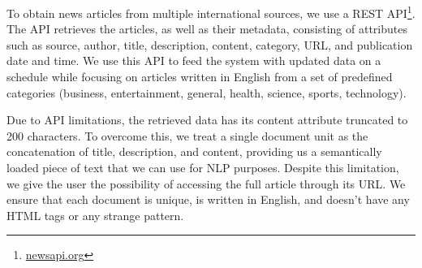 \documentclass[a4paper]{article}
\begin{document}
\begin{table}[H]
  \centering
  \caption{Competitive Intelligence resources on the web - \citet{dey2011}}
  \label{table1}
\end{table}

To obtain news articles from multiple international sources, we use a REST API\footnote{\href{https://newsapi.org/}{newsapi.org}}. The API retrieves the articles, as well as their metadata, consisting of attributes such as source, author, title, description, content, category, URL, and publication date and time. We use this API to feed the system with updated data on a schedule while focusing on articles written in English from a set of predefined categories (business, entertainment, general, health, science, sports, technology).

Due to API limitations, the retrieved data has its content attribute truncated to 200 characters. To overcome this, we treat a single document unit as the concatenation of title, description, and content, providing us a semantically loaded piece of text that we can use for NLP purposes. Despite this limitation, we give the user the possibility of accessing the full article through its URL. We ensure that each document is unique, is written in English, and doesn't have any HTML tags or any strange pattern.
\end{document}
